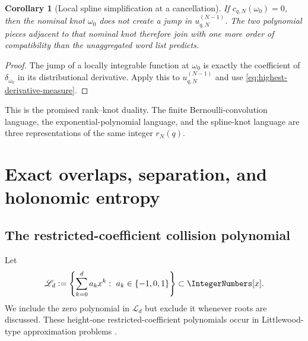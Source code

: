 \documentclass[11pt]{article}
\numberwithin{equation}{section}
\newtheorem{corollary}[theorem]{Corollary}
\theoremstyle{definition}
\theoremstyle{remark}
\begin{document}
\begin{corollary}[Local spline simplification at a cancellation]
\label{cor:spline-cancellation}
If $c_{q,N}(\omega_0)=0$, then the nominal knot $\omega_0$ does not create a
jump in $u_{q,N}^{(N-1)}$.  The two polynomial pieces adjacent to that nominal
knot therefore join with one more order of compatibility than the unaggregated
word list predicts.
\end{corollary}
\begin{proof}
The jump of a locally integrable function at $\omega_0$ is exactly the
coefficient of $\delta_{\omega_0}$ in its distributional derivative.  Apply
this to $u_{q,N}^{(N-1)}$ and use \eqref{eq:highest-derivative-measure}.
\end{proof}

This is the promised rank--knot duality.  The finite Bernoulli-convolution
language, the exponential-polynomial language, and the spline-knot language
are three representations of the same integer $r_N(q)$.

\section{Exact overlaps, separation, and holonomic entropy}
\label{sec:overlap}

\subsection{The restricted-coefficient collision polynomial}

Let
\begin{equation}
 \mathscr L_d:=
 \left\{\sum_{k=0}^{d}a_kx^k:\ a_k\in\{-1,0,1\}\right\}
 \subset\IntegerNumbers[x].
 \label{eq:littlewood-class}
\end{equation}
We include the zero polynomial in $\mathscr L_d$ but exclude it whenever roots
are discussed.  These height-one restricted-coefficient polynomials occur in
Littlewood-type approximation problems \cite{BorweinPinner,BorweinErdelyiKos}.
\end{document}
